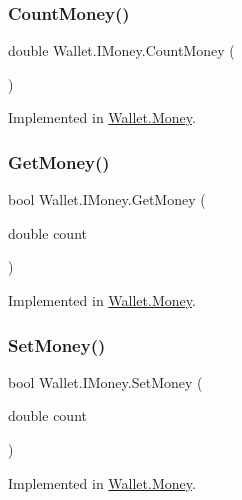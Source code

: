 \subsubsection{\texorpdfstring{Count\+Money()}{CountMoney()}}
{\footnotesize\ttfamily double Wallet.\+I\+Money.\+Count\+Money (\begin{DoxyParamCaption}{ }\end{DoxyParamCaption})}



Implemented in \hyperlink{class_wallet_1_1_money_acc17708e69b93b545c37e0f4c367ebe4}{Wallet.\+Money}.

\hypertarget{interface_wallet_1_1_i_money_a7eb41b256ff191c87f5bca82504244fe}{}\label{interface_wallet_1_1_i_money_a7eb41b256ff191c87f5bca82504244fe} 
\subsubsection{\texorpdfstring{Get\+Money()}{GetMoney()}}
{\footnotesize\ttfamily bool Wallet.\+I\+Money.\+Get\+Money (\begin{DoxyParamCaption}\item[{double}]{count }\end{DoxyParamCaption})}



Implemented in \hyperlink{class_wallet_1_1_money_a6a66f552f42767fce97bd0945d91cd6b}{Wallet.\+Money}.

\hypertarget{interface_wallet_1_1_i_money_a73409586903369db2c15c60623731834}{}\label{interface_wallet_1_1_i_money_a73409586903369db2c15c60623731834} 
\subsubsection{\texorpdfstring{Set\+Money()}{SetMoney()}}
{\footnotesize\ttfamily bool Wallet.\+I\+Money.\+Set\+Money (\begin{DoxyParamCaption}\item[{double}]{count }\end{DoxyParamCaption})}



Implemented in \hyperlink{class_wallet_1_1_money_a5a37d3aa171327b361f985964dc44534}{Wallet.\+Money}.



